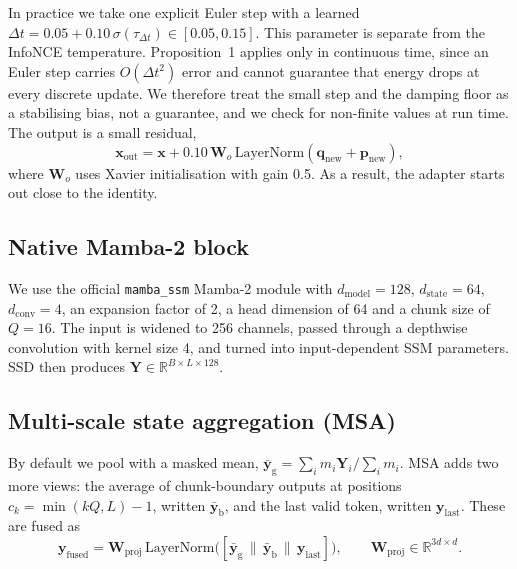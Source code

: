 \documentclass[pdflatex,sn-mathphys-num]{sn-jnl}
\begin{document}
In practice we take one explicit Euler step with a learned $\Delta t=0.05+0.10\,\sigma(\tau_{\Delta t})\in[0.05,0.15]$. This parameter is separate from the InfoNCE temperature. Proposition~1 applies only in continuous time, since an Euler step carries $O(\Delta t^2)$ error and cannot guarantee that energy drops at every discrete update. We therefore treat the small step and the damping floor as a stabilising bias, not a guarantee, and we check for non-finite values at run time. The output is a small residual,
\begin{equation}
\mathbf{x}_{\mathrm{out}}=\mathbf{x}+0.10\,\mathbf{W}_o\,\mathrm{LayerNorm}(\mathbf{q}_{\mathrm{new}}+\mathbf{p}_{\mathrm{new}}),
\label{eq:hedoout}
\end{equation}
where $\mathbf{W}_o$ uses Xavier initialisation with gain 0.5. As a result, the adapter starts out close to the identity.

\subsection{Native Mamba-2 block}
We use the official \texttt{mamba\_ssm} Mamba-2 module with $d_{\mathrm{model}}=128$, $d_{\mathrm{state}}=64$, $d_{\mathrm{conv}}=4$, an expansion factor of 2, a head dimension of 64 and a chunk size of $Q=16$. The input is widened to 256 channels, passed through a depthwise convolution with kernel size 4, and turned into input-dependent SSM parameters. SSD then produces $\mathbf{Y}\in\mathbb{R}^{B\times L\times128}$.

\subsection{Multi-scale state aggregation (MSA)}
By default we pool with a masked mean, $\bar{\mathbf{y}}_{\mathrm{g}}=\sum_i m_i\mathbf{Y}_i/\sum_i m_i$. MSA adds two more views: the average of chunk-boundary outputs at positions $c_k=\min(kQ,L)-1$, written $\bar{\mathbf{y}}_{\mathrm{b}}$, and the last valid token, written $\mathbf{y}_{\mathrm{last}}$. These are fused as
\begin{equation}
\mathbf{y}_{\mathrm{fused}}=\mathbf{W}_{\mathrm{proj}}\,\mathrm{LayerNorm}\big([\bar{\mathbf{y}}_{\mathrm{g}}\,\|\,\bar{\mathbf{y}}_{\mathrm{b}}\,\|\,\mathbf{y}_{\mathrm{last}}]\big),\qquad \mathbf{W}_{\mathrm{proj}}\in\mathbb{R}^{3d\times d}.
\label{eq:msa}
\end{equation}
\end{document}
